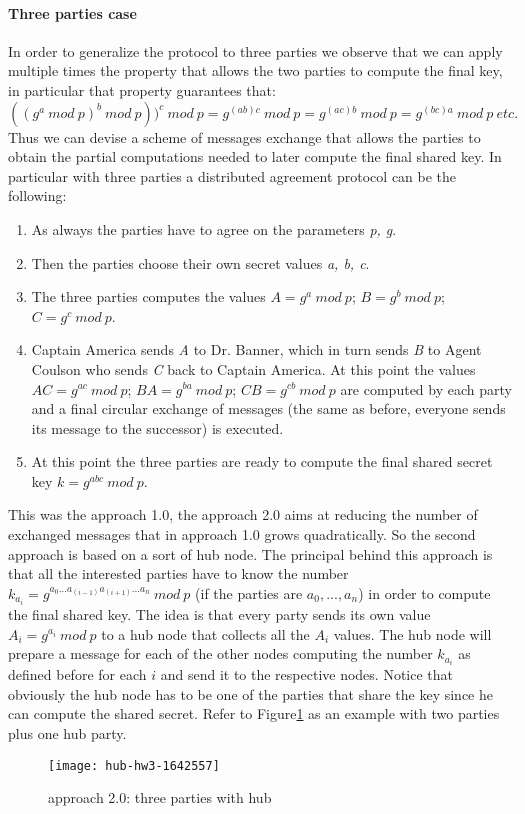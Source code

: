 \documentclass[11pt]{article}
\begin{document}
\paragraph*{Three parties case}
In order to generalize the protocol to three parties we observe that we can apply multiple times the property that allows the two parties to compute the final key, in particular that property guarantees that:\\
$((g^a\ mod\ p)^b\ mod\ p))^c\ mod\ p = g^{(ab)c}\ mod\ p = g^{(ac)b}\ mod\ p = g^{(bc)a}\ mod\ p\ etc.$\\
Thus we can devise a scheme of messages exchange that allows the parties to obtain the partial computations needed to later compute the final shared key.
In particular with three parties a distributed agreement protocol can be the following:\\
\begin{enumerate}
\item As always the parties have to agree on the parameters \textit{p, g}.
\item Then the parties choose their own secret values \textit{a, b, c}.
\item The three parties computes the values $A = g^a\ mod\ p$; $B = g^b\ mod\ p$; $C = g^c\ mod\ p$.
\item Captain America sends \textit{A} to Dr. Banner, which in turn sends \textit{B} to Agent Coulson who sends \textit{C} back to Captain America. At this point the values $AC = g^{ac}\ mod\ p$; $BA = g^{ba}\ mod\ p$; $CB = g^{cb}\ mod\ p$ are computed by each party and a final circular exchange of messages (the same as before, everyone sends its message to the successor) is executed.
\item At this point the three parties are ready to compute the final shared secret key $k = g^{abc}\ mod\ p$.
\end{enumerate}

This was the approach 1.0, the approach 2.0 aims at reducing the number of exchanged messages that in approach 1.0 grows quadratically. So the second approach is based on a sort of hub node. The principal behind this approach is that all the interested parties have to know the number $k_{a_i} = g^{a_0...a_{(i-1)}a_{(i+1)}...a_n}\ mod\ p$ (if the parties are $a_0,...,a_n$) in order to compute the final shared key. The idea is that every party sends its own value $A_i = g^{a_i}\ mod\ p$ to a hub node that collects all the $A_i$ values. The hub node will prepare a message for each of the other nodes computing the number $k_{a_i}$ as defined before for each $i$ and send it to the respective nodes. Notice that obviously the hub node has to be one of the parties that share the key since he can compute the shared secret. Refer to Figure\ref{fig:hub} as an example with two parties plus one hub party.
\begin{figure}[h]
\texttt{[image: hub-hw3-1642557]}
\centering
\caption{approach 2.0: three parties with hub}
\label{fig:hub}
\end{figure}
\end{document}

